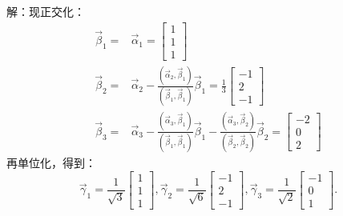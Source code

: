 解：现正交化：
\begin{align*}
\vec{\beta}_1=&\vec{\alpha}_1=\begin{bmatrix}1\\1\\1\end{bmatrix}\\
\vec{\beta}_2=&\vec{\alpha}_2-\frac{(\vec{\alpha}_2,\vec{\beta}_1)}{(\vec{\beta}_1,\vec{\beta}_1)}\vec{\beta}_1
              =\frac{1}{3}\begin{bmatrix}-1\\2\\-1\end{bmatrix}\\
\vec{\beta}_3=&\vec{\alpha}_3-\frac{(\vec{\alpha}_3,\vec{\beta}_1)}{(\vec{\beta}_1,\vec{\beta}_1)}\vec{\beta}_1-
              \frac{(\vec{\alpha}_3,\vec{\beta}_2)}{(\vec{\beta}_2,\vec{\beta}_2)}\vec{\beta}_2
              =\begin{bmatrix}-2\\0\\2\end{bmatrix}
\end{align*}
再单位化，得到：
\begin{equation*}
\vec{\gamma}_1=\frac{1}{\sqrt{3}}\begin{bmatrix}1\\1\\1\end{bmatrix},
\vec{\gamma}_2=\frac{1}{\sqrt{6}}\begin{bmatrix}-1\\2\\-1\end{bmatrix},
\vec{\gamma}_3=\frac{1}{\sqrt{2}}\begin{bmatrix}-1\\0\\1\end{bmatrix}.
\end{equation*}

